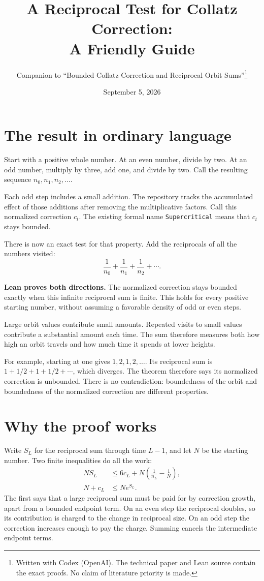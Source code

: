 \documentclass[11pt]{article}
\title{A Reciprocal Test for Collatz Correction:\\
\Large A Friendly Guide}
\author{Companion to ``Bounded Collatz Correction and Reciprocal Orbit Sums''\thanks{Written with Codex (OpenAI). The technical paper and Lean source contain the exact proofs. No claim of literature priority is made.}}
\date{September 5, 2026}
\begin{document}
\maketitle
\section{The result in ordinary language}
Start with a positive whole number. At an even number, divide by two. At an odd number, multiply by three, add one, and divide by two. Call the resulting sequence $n_0,n_1,n_2,\ldots$.

Each odd step includes a small addition. The repository tracks the accumulated effect of those additions after removing the multiplicative factors. Call this normalized correction $c_t$. The existing formal name \texttt{Supercritical} means that $c_t$ stays bounded.

There is now an exact test for that property. Add the reciprocals of all the numbers visited:
\[
\frac1{n_0}+\frac1{n_1}+\frac1{n_2}+\cdots.
\]
\begin{keyidea}
\textbf{Lean proves both directions.} The normalized correction stays bounded exactly when this infinite reciprocal sum is finite. This holds for every positive starting number, without assuming a favorable density of odd or even steps.
\end{keyidea}
Large orbit values contribute small amounts. Repeated visits to small values contribute a substantial amount each time. The sum therefore measures both how high an orbit travels and how much time it spends at lower heights.

For example, starting at one gives $1,2,1,2,\ldots$. Its reciprocal sum is $1+1/2+1+1/2+\cdots$, which diverges. The theorem therefore says its normalized correction is unbounded. There is no contradiction: boundedness of the orbit and boundedness of the normalized correction are different properties.

\newpage
\section{Why the proof works}
Write $S_L$ for the reciprocal sum through time $L-1$, and let $N$ be the starting number. Two finite inequalities do all the work:
\[
\begin{aligned}
N S_L&\le6c_L+N\left(\frac1{n_L}-\frac1N\right),\\
N+c_L&\le N e^{S_L}.
\end{aligned}
\]
The first says that a large reciprocal sum must be paid for by correction growth, apart from a bounded endpoint term. On an even step the reciprocal doubles, so its contribution is charged to the change in reciprocal size. On an odd step the correction increases enough to pay the charge. Summing cancels the intermediate endpoint terms.
\end{document}
